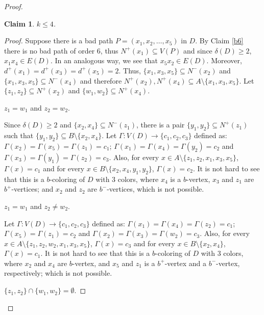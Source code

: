 \documentclass[12pt]{article}
\newtheorem{claim}[theorem]{Claim}
\begin{document}
\begin{proof}
\begin{claim}\label{b5} $k\leq 4$.
\end{claim}
\begin{proof} Suppose there is a bad path $P=(x_1, x_2, \dots, x_5)$ in $D$. By Claim \ref{b6} there is no bad path of order $6$, thus $N^+(x_1) \subseteq V(P)$ and since $\delta(D) \geq 2$,  $x_1x_4\in E(D)$. In an analogous way, we see that $x_5x_2\in E(D)$. Moreover, $d^+(x_1) = d^+(x_3) = d^+(x_5)=2$. Thus, $\{x_1, x_3, x_5\}\subseteq N^-(x_2)$ and $\{x_1, x_3, x_5\}\subseteq N^-(x_4)$ and therefore $N^+(x_2), N^+(x_4)\subseteq A\setminus \{x_1, x_3, x_5\}$. Let $\{z_1, z_2\}\subseteq N^+(x_2)$ and $\{w_1, w_2\}\subseteq N^+(x_4)$. 

 $z_1= w_1$ and $z_2 = w_2$.

\noindent Since $\delta(D) \geq 2$ and $\{x_2, x_4\}\subseteq N^-(z_1)$, there is a pair $\{y_1, y_2\}\subseteq N^+(z_1)$ such that $\{y_1, y_2\} \subseteq B\setminus\{x_2, x_4\}$. Let $\Gamma: V(D) \rightarrow \{c_1, c_2, c_3\}$ defined as: $\Gamma(x_2) =\Gamma(x_5) = \Gamma(z_1) = c_1$; $\Gamma(x_1)  = \Gamma(x_4)  = \Gamma(y_2) =  c_2$ and $\Gamma(x_3) = \Gamma(y_1) = \Gamma(z_2) = c_3$. Also, for every $x\in A\setminus\{z_1, z_2, x_1, x_3, x_5\}$, $\Gamma(x) = c_1$ and for every $x\in B\setminus\{x_2, x_4, y_1, y_2\}$, $\Gamma(x) = c_2$. It is not hard to see that this is a $b$-coloring of $D$ with 3 colors, where $x_4$ is a  $b$-vertex,  $x_3$ and $z_1$ are $b^+$-vertices; and $x_2$ and $z_2$ are $b^-$-vertices,  which is not possible. 

 $z_1= w_1$ and $z_2 \not=  w_2$.

\noindent  Let $\Gamma: V(D) \rightarrow \{c_1, c_2, c_3\}$ defined as: $\Gamma(x_1) = \Gamma(x_4) = \Gamma(z_2) = c_1$; $\Gamma(x_5)  = \Gamma(z_1) = c_2$ and $\Gamma(x_2) = \Gamma(x_3) = \Gamma(w_2) = c_3$. Also, for every $x\in A\setminus\{z_1, z_2, w_2, x_1, x_3, x_5\}$, $\Gamma(x) = c_3$ and for every $x\in B\setminus\{x_2, x_4\}$, $\Gamma(x) = c_1$. It is not hard to see that this is a $b$-coloring of $D$ with 3 colors, where $x_2$ and $x_4$ are  $b$-vertex, and $x_5$ and $z_1$ is a $b^+$-vertex and a $b^-$-vertex, respectively; which is not possible. 

  $\{z_1, z_2\}\cap \{w_1, w_2\} = \emptyset$.


\end{proof}
\end{proof}
\end{document}
